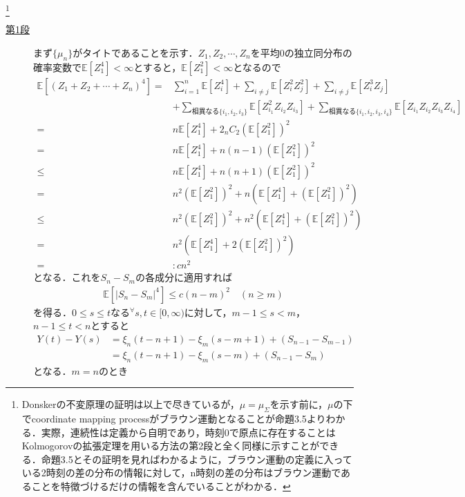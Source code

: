 \documentclass[dvipdfmx]{jsarticle}
\begin{document}
\footnote{Donskerの不変原理の証明は以上で尽きているが，$\mu=\mu_\Sigma$を示す前に，$\mu$の下でcoordinate mapping processがブラウン運動となることが\cite{taniguchi}命題3.5よりわかる．実際，連続性は定義から自明であり，時刻0で原点に存在することはKolmogorovの拡張定理を用いる方法の第2段と全く同様に示すことができる．\cite{taniguchi}命題3.5とその証明を見ればわかるように，ブラウン運動の定義に入っている2時刻の差の分布の情報に対して，n時刻の差の分布はブラウン運動であることを特徴づけるだけの情報を含んでいることがわかる．}
\begin{description}
\item[\underline{第1段}]
まず$\{\mu_n\}$がタイトであることを示す．$Z_1,Z_2,\cdots,Z_n$を平均0の独立同分布の確率変数で$\mathbb{E}[Z_1^4]<\infty$とすると，$\mathbb{E}[Z_1^2]<\infty$となるので
\begin{align*}
\mathbb{E}[(Z_1+Z_2+\cdots+Z_n)^4]=
&\sum_{i=1}^n\mathbb{E}[Z_i^4]+\sum_{i\neq j}\mathbb{E}[Z_i^2Z_j^2]+\sum_{i\neq j}\mathbb{E}[Z_i^3Z_j] \\
&+\sum_{相異なる\{i_1,i_2,i_3\}}\mathbb{E}[Z_{i_1}^2Z_{i_2}Z_{i_3}]+\sum_{相異なる\{i_1,i_2,i_3,i_4\}}\mathbb{E}[Z_{i_1}Z_{i_2}Z_{i_3}Z_{i_4}] \\
=&n\mathbb{E}[Z_1^4]+2 _nC_2\left(\mathbb{E}[Z_1^2]\right)^2 \\
=&n\mathbb{E}[Z_1^4]+n(n-1)\left(\mathbb{E}[Z_1^2]\right)^2 \\
\leq&n\mathbb{E}[Z_1^4]+n(n+1)\left(\mathbb{E}[Z_1^2]\right)^2 \\
=&n^2\left(\mathbb{E}[Z_1^2]\right)^2+n\left(\mathbb{E}[Z_1^4]+\left(\mathbb{E}[Z_1^2]\right)^2\right) \\
\leq&n^2\left(\mathbb{E}[Z_1^2]\right)^2+n^2\left(\mathbb{E}[Z_1^4]+\left(\mathbb{E}[Z_1^2]\right)^2\right) \\
=&n^2\left(\mathbb{E}[Z_1^4]+2\left(\mathbb{E}[Z_1^2]\right)^2\right) \\
=&{\!}:{\!}cn^2
\end{align*}
となる．これを$S_n-S_m$の各成分に適用すれば
\begin{align*}
\mathbb{E}[|S_n-S_m|^4]\leq c(n-m)^2 \quad (n\geq m)
\end{align*}
を得る．$0\leq s\leq t$なる$^\forall s,t\in [0,\infty)$に対して，$m-1\leq s<m$，$n-1\leq t<n$とすると
\begin{align*}
Y(t)-Y(s)&=\xi_{n}(t-n+1)-\xi_{m}(s-m+1)+(S_{n-1}-S_{m-1}) \\
&=\xi_{n}(t-n+1)-\xi_{m}(s-m)+(S_{n-1}-S_{m})
\end{align*}
となる．$m=n$のとき

\end{description}
\end{document}
